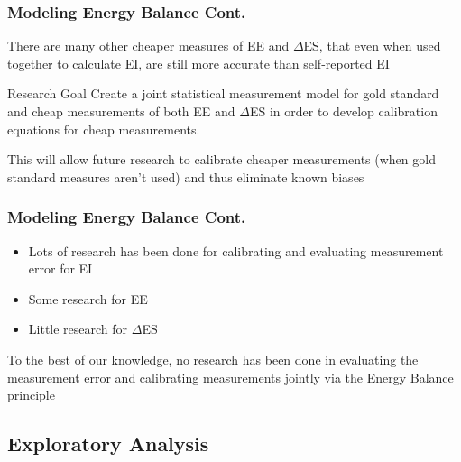 \documentclass[handout]{beamer}\usepackage[]{graphicx}\usepackage[]{color}
\begin{document}
\begin{frame}
\frametitle{Modeling Energy Balance Cont.}
There are many other cheaper measures of EE and $\Delta$ES, that even when used together to calculate EI, are still more accurate than self-reported EI \\

\vspace{0.4cm}
\begin{block}{Research Goal}
Create a joint statistical measurement model for gold standard and cheap measurements of both EE and $\Delta$ES in order to develop calibration equations for cheap measurements.\\
\end{block}

\vspace{0.4cm}

This will allow future research to calibrate cheaper measurements (when gold standard measures aren't used) and thus eliminate known biases

\end{frame}

\begin{frame}
\frametitle{Modeling Energy Balance Cont. }

\begin{itemize}
\item
Lots of research has been done for calibrating and evaluating measurement error for EI
\item
Some research for EE
\item
Little research for $\Delta$ES
\end{itemize}

\vspace{0.2cm}

To the best of our knowledge, no research has been done in evaluating the measurement error and calibrating measurements jointly via the Energy Balance principle


\end{frame}


\subsection{Exploratory Analysis}
\end{document}
